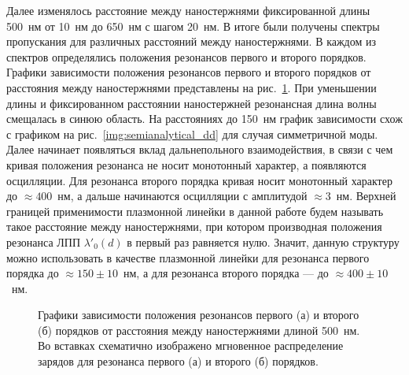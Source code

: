 Далее изменялось расстояние между наностержнями фиксированной длины 500~нм от 10~нм до 650~нм с шагом 20~нм. В итоге были получены спектры пропускания для различных расстояний между наностержнями. В каждом из спектров определялись положения резонансов первого и второго порядков. Графики зависимости положения резонансов первого и второго порядков от расстояния между наностержнями представлены на рис.~\ref{img:a500PML}. При уменьшении длины и фиксированном расстоянии наностержней резонансная длина волны смещалась в синюю область. На расстояниях до 150~нм график зависимости схож с графиком на рис.~\ref{img:semianalytical_dd} для случая симметричной моды. Далее начинает появляться вклад дальнепольного взаимодействия, в связи с чем кривая положения резонанса не носит монотонный характер, а появляются осцилляции. Для резонанса второго порядка кривая носит монотонный характер до $ \approx 400 $~нм, а дальше начинаются осцилляции с амплитудой $ \approx 3 $~нм. Верхней границей применимости плазмонной линейки в данной работе будем называть такое расстояние между наностержнями, при котором производная положения резонанса ЛПП $ \lambda'_0 (d) $  в первый раз равняется нулю. Значит, данную структуру можно использовать в качестве плазмонной линейки для резонанса первого порядка до $ \approx 150 \pm 10 $~нм, а для резонанса второго порядка --- до $ \approx 400 \pm 10 $~нм.
\begin{figure}
\caption{Графики зависимости положения  резонансов первого (а) и второго (б) порядков от расстояния между наностержнями длиной 500~нм. Во вставках схематично изображено мгновенное распределение зарядов для резонанса первого (а) и второго (б) порядков.}
\label{img:a500PML}
\end{figure}
